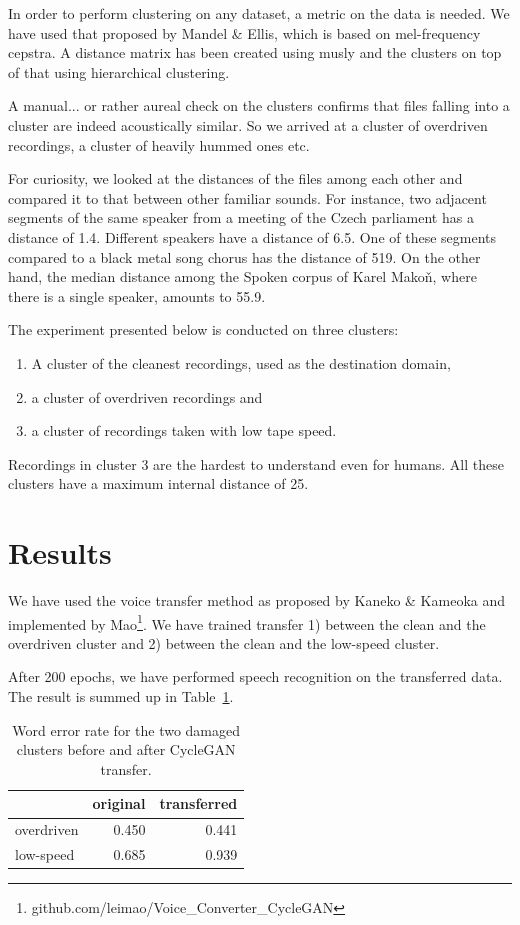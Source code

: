 \documentclass[conference]{IEEEtran}
\begin{document}
In order to perform clustering on any dataset, a metric on the data is needed.
We have used that proposed by Mandel \& Ellis\cite{mandel2005song}, which
is based on mel-frequency cepstra. A distance matrix has been created using
musly and the clusters on top of that using
hierarchical clustering\cite{johnson1967hierarchical}.

A manual... or rather aureal check on the clusters confirms that files falling
into a cluster are indeed acoustically similar. So we arrived at a cluster of
overdriven recordings, a cluster of heavily hummed ones etc.

For curiosity, we looked at the distances of the files among each other and
compared it to that between other familiar sounds. For instance, two adjacent
segments of the same speaker from a meeting of the Czech parliament has a
distance of 1.4. Different speakers have a distance of 6.5. One of these
segments compared to a black metal song chorus has the distance of 519. On the
other hand, the median distance among the Spoken corpus of Karel Makoň, where
there is a single speaker, amounts to 55.9.

The experiment presented below is conducted on three clusters:
\begin{enumerate}
\item{A cluster of the cleanest recordings, used as the destination domain,}
\item{a cluster of overdriven recordings and}
\item{a cluster of recordings taken with low tape speed.}
\end{enumerate}
Recordings in cluster 3 are the hardest to understand even for humans. All these
clusters have a maximum internal distance of 25.

\section{Results}

We have used the voice transfer method as proposed by Kaneko \&
Kameoka\cite{kaneko2017parallel} and implemented by
Mao\footnote{github.com/leimao/Voice\_Converter\_CycleGAN}. We have trained
transfer 1) between the clean and the overdriven cluster and 2) between the
clean and the low-speed cluster.

After 200 epochs, we have performed speech recognition on the transferred data.
The result is summed up in Table~\ref{tab:results}.

\begin{table}[htpb]
\caption{Word error rate for the two damaged clusters before and after CycleGAN
transfer.}\label{tab:results}
\centering
\begin{tabular}{|l||r|r|}
\hline
           & original & transferred \\
\hline
overdriven & 0.450 & 0.441 \\
low-speed  & 0.685 & 0.939 \\
\hline
\end{tabular}
\end{table}
\end{document}
